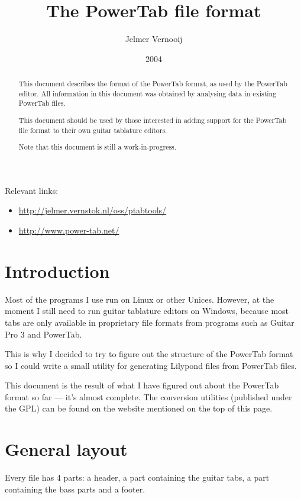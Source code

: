\documentclass[a4paper]{article}
\begin{document}
\title{The PowerTab file format}
\date{2004}
\author{Jelmer Vernooij}
\maketitle

Relevant links:

\begin{itemize}
\item \url{http://jelmer.vernstok.nl/oss/ptabtools/}
\item \url{http://www.power-tab.net/}
\end{itemize}

\begin{abstract}
This document describes the format of the PowerTab format, as 
used by the PowerTab editor. All information 
in this document was obtained by analysing data in existing PowerTab files.

This document should be used by those interested in adding support 
for the PowerTab file format to their own guitar tablature editors.

Note that this document is still a work-in-progress.
\end{abstract}

\section{Introduction}

Most of the programs I use run on Linux or other Unices. However, 
at the moment I still need to run guitar tablature editors on Windows, 
because most tabs are only available in proprietary file formats from 
programs such as Guitar Pro 3 and PowerTab.

This is why I decided to try to figure out the structure of the PowerTab 
format so I could write a small utility for generating Lilypond files 
from PowerTab files.

This document is the result of what I have figured out about the PowerTab 
format so far --- it's almost complete. The conversion utilities 
(published under the GPL) can be found on the website mentioned on the top of 
this page.

\section{General layout}

Every file has 4 parts: a header, a part containing the guitar tabs, a 
part containing the bass parts and a footer.
\end{document}
